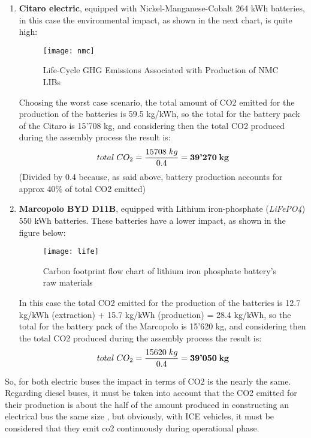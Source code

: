 \documentclass{article}
\begin{document}
\begin{enumerate}
\item \textbf{Citaro electric}, equipped with Nickel-Manganese-Cobalt 264 kWh batteries,\\
in this case the environmental impact, as shown in the next chart, is quite high:
\begin{figure}[H]
\centering
\texttt{[image: nmc]}
\caption{Life-Cycle GHG Emissions Associated with Production of NMC LIBs \cite{nmc}}
\end{figure}
Choosing the worst case scenario, the total amount of CO2 emitted for the production of the batteries is 59.5 kg/kWh, so the total for the battery pack of the Citaro is 15'708 kg, and considering then the total CO2 produced during the assembly process the result is: 
\begin{equation}
total\;CO_2=\frac{15708\;kg}{0.4}=\textbf{39'270\:kg}
\end{equation}
(Divided by 0.4 because, as said above, battery production accounts for approx 40\% of total CO2 emitted)
\newpage
\item \textbf{Marcopolo BYD D11B}, equipped with Lithium iron-phosphate (\textit{LiFePO4}) 550 kWh batteries. These batteries have a lower impact, as shown in the figure below:
\begin{figure}[H]
\centering
\texttt{[image: life]}
\caption{Carbon footprint flow chart of lithium iron phosphate battery’s raw materials \cite{life}}
\end{figure}
In this case the total CO2 emitted for the production of the batteries is 12.7 kg/kWh (extraction) + 15.7 kg/kWh (production) =
28.4 kg/kWh, so the total for the battery pack of the Marcopolo is 15'620 kg, and considering then the total CO2 produced during the assembly process the result is: 
\begin{equation}
total\;CO_2=\frac{15620\;kg}{0.4}=\textbf{39'050\:kg}
\end{equation}

\end{enumerate}
So, for both electric buses the impact in terms of CO2 is the nearly the same.\\
Regarding diesel buses, it must be taken into account that the CO2 emitted for their production is about the half of the amount produced in constructing an electrical bus the same size \cite{40}, but obviously, with ICE vehicles, it must be considered that they emit co2 continuously during operational phase.\\
\end{document}
